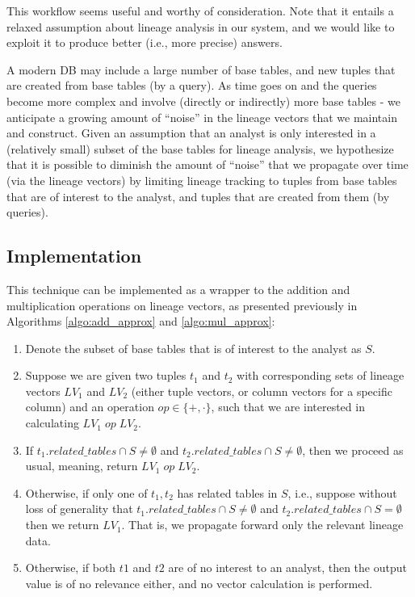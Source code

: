 This workflow seems useful and worthy of consideration. Note that it entails a relaxed assumption about lineage analysis in our system, and we would like to exploit it to produce better (i.e., more precise) answers.
\par A modern DB may include a large number of base tables, and new tuples that are created from base tables (by a query). As time goes on and the queries become more complex and involve (directly or indirectly) more base tables - we anticipate a growing amount of ``noise'' in the lineage vectors that we maintain and construct.
Given an assumption that an analyst is only interested in a (relatively small) subset of the base tables for lineage analysis, we hypothesize that it is possible to diminish the amount of ``noise'' that we propagate over time (via the lineage vectors) by limiting lineage tracking to tuples from base tables that are of interest to the analyst, and tuples that are created from them (by queries).

\subsection{Implementation}
This technique can be implemented as a wrapper to the addition and multiplication operations on lineage vectors, as presented previously in Algorithms \ref{algo:add_approx} and \ref{algo:mul_approx}: 
\begin{enumerate}
    \item Denote the subset of base tables that is of interest to the analyst as $S$.
    \item Suppose we are given two tuples $t_1$ and $t_2$ with corresponding sets of lineage vectors $LV_1$ and $LV_2$ (either tuple vectors, or column vectors for a specific column) and an operation $op \in \{+, \cdot\}$, such that we are interested in calculating $LV_1 \; op \; LV_2$.
    \item If $t_1.related\_tables \cap S \neq \emptyset$ and $t_2.related\_tables \cap S \neq \emptyset$, then we proceed as usual, meaning, return $LV_1 \; op \; LV_2$. 
    \item Otherwise, if only one of $t_1, t_2$ has related tables in $S$, i.e., suppose without loss of generality that $t_1.related\_tables \cap S \neq \emptyset$ and $t_2.related\_tables \cap S = \emptyset$ then we return $LV_1$.
    That is, we propagate forward only the relevant lineage data.
    \item Otherwise, if both $t1$ and $t2$ are of no interest to an analyst, then the output value is of no relevance either, and no vector calculation is performed.
\end{enumerate}

